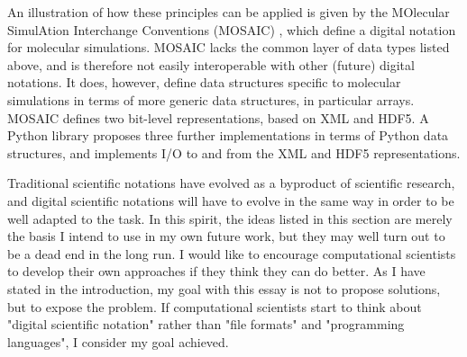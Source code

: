 An illustration of how these principles can be applied is given by the MOlecular SimulAtion Interchange Conventions (MOSAIC) \cite{hinsen_mosaic_2014}, which define a digital notation for molecular simulations. MOSAIC lacks the common layer of data types listed above, and is therefore not easily interoperable with other (future) digital notations. It does, however, define data structures specific to molecular simulations in terms of more generic data structures, in particular arrays. MOSAIC defines two bit-level representations, based on XML and HDF5. A Python library \cite{hinsen_pymosaic_2014} proposes three further implementations in terms of Python data structures, and implements I/O to and from the XML and HDF5 representations.

Traditional scientific notations have evolved as a byproduct of scientific research, and digital scientific notations will have to evolve in the same way in order to be well adapted to the task. In this spirit, the ideas listed in this section are merely the basis I intend to use in my own future work, but they may well turn out to be a dead end in the long run. I would like to encourage computational scientists to develop their own approaches if they think they can do better. As I have stated in the introduction, my goal with this essay is not to propose solutions, but to expose the problem. If computational scientists start to think about "digital scientific notation" rather than "file formats" and "programming languages", I consider my goal achieved.







\]